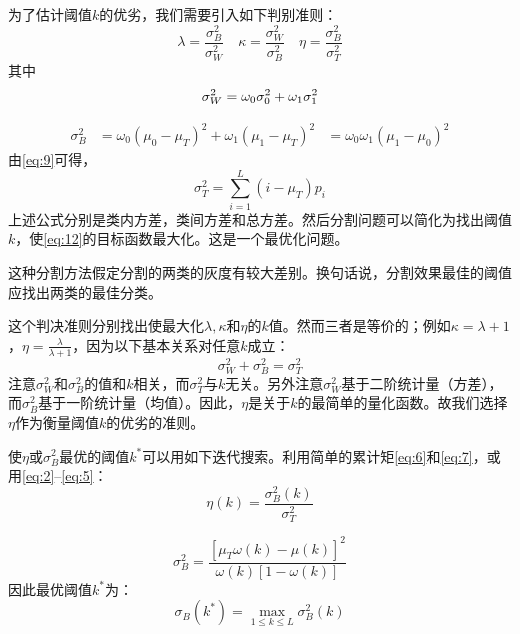 为了估计阈值$k$的优劣，我们需要引入如下判别准则：
\begin{equation}
  \label{eq:12}
  \lambda=\frac{\sigma_B^2}{\sigma_W^2}\quad
  \kappa=\frac{\sigma_W^2}{\sigma_B^2}\quad
  \eta=\frac{\sigma_B^2}{\sigma_T^2}
\end{equation}
其中
\begin{equation}
  \label{eq:13}
  \sigma_W^2 = \omega_0\sigma_0^2+\omega_1\sigma_1^2\\
\end{equation}

\begin{equation}
  \label{eq:14}
  \begin{aligned}
    \sigma_B^2 &= \omega_0(\mu_0-\mu_T)^2+\omega_1(\mu_1-\mu_T)^2
    &= \omega_0\omega_1(\mu_1-\mu_0)^2
  \end{aligned}
\end{equation}
由\eqref{eq:9}可得，
\begin{equation}
  \label{eq:15}
  \sigma_T^2=\sum_{i=1}^L(i-\mu_T)p_i
\end{equation}
上述公式分别是类内方差，类间方差和总方差。然后分割问题可以简化为找出阈值$k$，使\eqref{eq:12}的目标函数最大化。这是一个最优化问题。

这种分割方法假定分割的两类的灰度有较大差别。换句话说，分割效果最佳的阈值应找出两类的最佳分类。

这个判决准则分别找出使最大化$\lambda,\kappa$和$\eta$的$k$值。然而三者是等价的；例如$\kappa=\lambda+1$，$\eta=\frac{\lambda}{\lambda+1}$，因为以下基本关系对任意$k$成立：
\begin{equation}
  \label{eq:16}
  \sigma_W^2+\sigma_B^2=\sigma_T^2
\end{equation}
注意$\sigma_W^2$和$\sigma_B^2$的值和$k$相关，而$\sigma_T^2$与$k$无关。另外注意$\sigma_W^2$基于二阶统计量（方差），而$\sigma_B^2$基于一阶统计量（均值）。因此，$\eta$是关于$k$的最简单的量化函数。故我们选择$\eta$作为衡量阈值$k$的优劣的准则。

使$\eta$或$\sigma_B^2$最优的阈值$k^*$可以用如下迭代搜索。利用简单的累计矩\eqref{eq:6}和\eqref{eq:7}，或用\eqref{eq:2}--\eqref{eq:5}：
\begin{equation}
  \label{eq:17}
  \eta(k)=\frac{\sigma_B^2(k)}{\sigma_T^2}
\end{equation}

\begin{equation}
  \label{eq:18}
  \sigma_B^2=\frac{[\mu_T\omega(k)-\mu(k)]^2}{\omega(k)[1-\omega(k)]}
\end{equation}
因此最优阈值$k^*$为：
\begin{equation}
  \label{eq:19}
  \sigma_B(k^*)=\max_{1\leqslant k\leqslant L}\sigma_B^2(k)
\end{equation}

